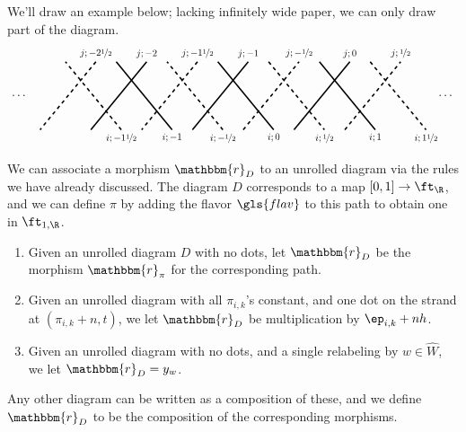 We'll draw an example below; lacking infinitely wide
paper, we can only draw part of the diagram.
\begin{equation} \label{eq:unroll-example}
       \tikz[very thick,xscale=1.5,baseline]{
           \draw (.8 ,-1) to node[below,at start, scale=.8]{$i;0$}(-.3,1);
           \draw (-.8 ,-1) to node[above, at end, scale=.8]{$j;-1$} (.3,1);
               \draw (-1.2 ,-1) to  node[below,at start, scale=.8]{$i;-1$} (-2.3,1);
               \draw (-2.8 ,-1) to node[above, at end, scale=.8]{$j;-2$}  (-1.7,1);
               \draw (1.2 ,-1) to node[above, at end, scale=.8]{$j;0$}  (2.3,1);
        \draw (2.8 ,-1) to  node[below,at start, scale=.8]{$i;1$} (1.7,1);
        \draw[dashed] (-.2,-1) -- node[below,at start, scale=.8]{$i;-\nicefrac{1}{2}$} (-1.3,1);
        \draw[dashed] (.2,-1) --  node[above, at end, scale=.8]{$j;-\nicefrac{1}{2}$}  (1.3,1);
        \draw[dashed] (-.7,1) -- node[above, at start, scale=.8]{$j;-1\nicefrac{1}{2}$}  (-1.8,-1);
        \draw[dashed] (.7,1) -- node[below,at end,
        scale=.8]{$i;\nicefrac{1}{2}$} (1.8,-1);
        \draw[dashed] (-2.2,-1) -- node[below,at start, scale=.8]{$i;-1\nicefrac{1}{2}$} (-3.3,1);
        \draw[dashed] (2.2,-1) --  node[above, at end, scale=.8]{$j;\nicefrac{1}{2}$}  (3.3,1);
        \draw[dashed] (-2.7,1) -- node[above, at start, scale=.8]{$j;-2\nicefrac{1}{2}$}  (-3.8,-1);
        \draw[dashed] (2.7,1) -- node[below,at end,
        scale=.8]{$i;1\nicefrac{1}{2}$} (3.8,-1);
        \node at (4.2,0){$\cdots$};
         \node at (-4.2,0){$\cdots$};
        }
\end{equation}


We can associate a morphism $\mathbbm{r}_D$ to an unrolled diagram via
the rules we have already discussed.  The diagram $D$ corresponds to a
map $[0,1]\to \ft_{\R}$,  and we can define $\pi$ by adding the flavor
$\gls{flav}$ to this path to obtain one in $\ft_{1,\R}$.  
\begin{definition}\hfill
  \begin{enumerate}
  \item Given an unrolled diagram $D$ with no dots, let
    $\mathbbm{r}_D$ be the morphism $\mathbbm{r}_\pi$ for the
    corresponding path.
  \item
    Given an unrolled diagram with all
    $\pi_{i,k}$'s constant, and one dot on the strand at
    $(\pi_{i,k}+n,t)$, we let $\mathbbm{r}_D$ be multiplication by
    $\ep_{i,k}+nh$.
\item   Given an unrolled diagram with no dots, and a single
  relabeling by $w\in \widehat{W}$, we let $\mathbbm{r}_D=y_w$.
  \end{enumerate}
Any other diagram can be written as a composition of these, and we
define $\mathbbm{r}_D$ to be the composition of the corresponding morphisms.
\end{definition}

